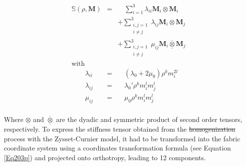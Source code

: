 \documentclass[a4paper,fleqn]{DC_ArtStyle}
\providecommand{\DIFadd}[1]{{\protect\color{blue}{#1}}} %
\providecommand{\DIFdel}[1]{{\protect\color{red}\sout{#1}}}                      %
\providecommand{\DIFaddbegin}{} %
\providecommand{\DIFaddend}{} %
\providecommand{\DIFdelbegin}{} %
\providecommand{\DIFdelend}{} %
\begin{document}
\begin{equation}
	\DIFdelbegin %
\DIFdelend \DIFaddbegin \begin{split}
		&\mathbb{S}(\rho,\mathbf{M}) &=& \quad\sum_{i=1}^{3} \lambda_{ii} \mathbf{M}_i \otimes \mathbf{M}_i \\ &&&+ \sum_{\substack{i,j=1\\i \neq j}}^{3} \lambda_{ij} \mathbf{M}_i \otimes \mathbf{M}_j \\ &&&+ \sum_{\substack{i,j=1\\i \neq j}}^{3} \mu_{ij} \mathbf{M}_i \overline{\underline{\otimes}} \mathbf{M}_j \\
		&\text{with} &\\
		&\qquad\lambda_{ii} &=& \quad(\lambda_0 + 2\mu_0)\rho^k m_i^{2l} \\
		&\qquad\lambda_{ij} &=& \quad\lambda_0' \rho^k m_i^{l} m_j^{l} \\
		&\qquad\mu_{ij} &=& \quad\mu_0 \rho^k m_i^{l} m_j^{l} \\
	\end{split}\DIFaddend 
	\label{Eq202}
\end{equation}

Where $\otimes$ and $\overline{\underline{\otimes}}$ are the dyadic and symmetric product of second order tensors, respectively. To express the stiffness tensor obtained from the \DIFdelbegin \DIFdel{homogenization }\DIFdelend \DIFaddbegin \DIFadd{homogenisation }\DIFaddend process with the Zysset-Curnier model, it had to be transformed into the fabric coordinate system using a coordinates transformation formula (see Equation \ref{Eq203p}) and projected onto orthotropy, leading to 12 components. 
\end{document}
